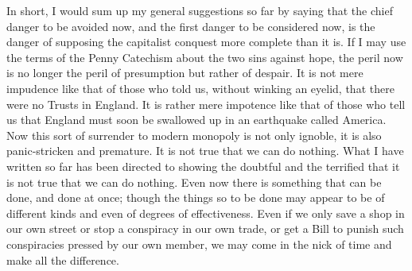 \documentclass{book}
\begin{document}
In short, I would sum up my general suggestions so far by saying that the chief danger to be avoided now, and the first danger to be considered now, is the danger of supposing the capitalist conquest more complete than it is. If I may use the terms of the Penny Catechism about the two sins against hope, the peril now is no longer the peril of presumption but rather of despair. It is not mere impudence like that of those who told us, without winking an eyelid, that there were no Trusts in England. It is rather mere impotence like that of those who tell us that England must soon be swallowed up in an earthquake called America. Now this sort of surrender to modern monopoly is not only ignoble, it is also panic-stricken and premature. It is not true that we can do nothing. What I have written so far has been directed to showing the doubtful and the terrified that it is not true that we can do nothing. Even now there is something that can be done, and done at once; though the things so to be done may appear to be of different kinds and even of degrees of effectiveness. Even if we only save a shop in our own street or stop a conspiracy in our own trade, or get a Bill to punish such conspiracies pressed by our own member, we may come in the nick of time and make all the difference.
\end{document}
